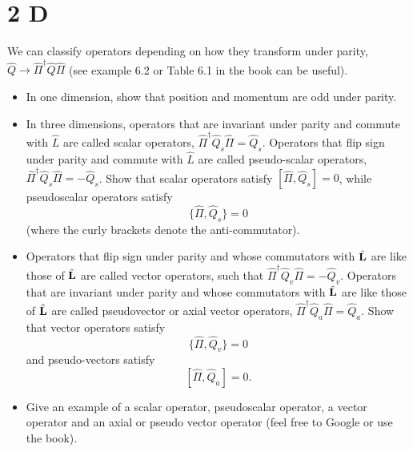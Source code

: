 \documentclass{article}
\begin{document}
\hfil

\hfil

\section*{2 D}
\begin{ques}\label{q2}
We can classify operators depending on how they transform under parity, $\hat{Q}\rightarrow \hat{\Pi}^\dagger \hat{Q}\hat{\Pi}$ (see example 6.2 or Table 6.1 in the book can be useful).

\begin{itemize}
\item[(a)] In one dimension, show that position and momentum are odd under parity.

\item[(b)] In three dimensions, operators that are invariant under parity and commute with $\hat L$ are called scalar operators, $\hat{\Pi}^\dagger \hat Q_s \hat{\Pi}=\hat Q_s$. Operators that flip sign under parity and commute with $\hat L$ are called pseudo-scalar operators, $\hat{\Pi}^\dagger \hat Q_s \hat{\Pi}=-\hat Q_s$. Show that scalar operators satisfy $[\hat{\Pi},\hat Q_s]=0$, while pseudoscalar operators satisfy
\[
\{\hat{\Pi},\hat Q_s\}=0
\]
(where the curly brackets denote the anti-commutator).

\item[(c)] Operators that flip sign under parity and whose commutators with $\hat {\mathbf{L}}$ are like those of $\hat {\mathbf{L}}$ are called vector operators, such that $\hat{\Pi}^\dagger \hat Q_v \hat{\Pi}=-\hat Q_v$. Operators that are invariant under parity and whose commutators with $\hat {\mathbf{L}}$ are like those of $\hat {\mathbf{L}}$ are called pseudovector or axial vector operators, $\hat{\Pi}^\dagger \hat Q_a \hat{\Pi}=\hat Q_a$. Show that vector operators satisfy
\[
\{\hat{\Pi},\hat Q_v\}=0
\]
and pseudo-vectors satisfy
\[
[\hat{\Pi},\hat Q_a]=0.
\]

\item[(d)] Give an example of a scalar operator, pseudoscalar operator, a vector operator and an axial or pseudo vector operator (feel free to Google or use the book).
\end{itemize}
\end{ques}
\end{document}
